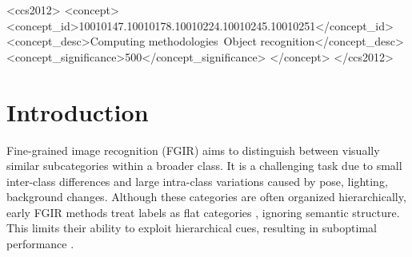 \documentclass[sigconf, screen, review, anonymous]{acmart}
\begin{document}
\begin{CCSXML}
<ccs2012>
   <concept>
       <concept_id>10010147.10010178.10010224.10010245.10010251</concept_id>
       <concept_desc>Computing methodologies~Object recognition</concept_desc>
       <concept_significance>500</concept_significance>
       </concept>
 </ccs2012>
\end{CCSXML}




\maketitle

\section{Introduction}
Fine-grained image recognition (FGIR) aims to distinguish between visually similar subcategories within a broader class. It is a challenging task due to small inter-class differences and large intra-class variations caused by pose, lighting, background changes. Although these categories are often organized hierarchically, early FGIR methods treat labels as flat categories \cite{zhang_part-based_2014, zheng_learning_2017}, ignoring semantic structure. This limits their ability to exploit hierarchical cues, resulting in suboptimal performance \cite{chen_fine-grained_2018}. 
\end{document}
